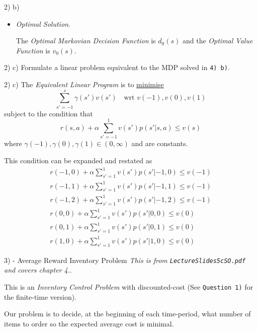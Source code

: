 \documentclass[11pt,a4paper]{article}
\begin{document}
\begin{answer}{2) b)}
\begin{itemize}
\begin{center}
\begin{tabular}{rcl}
        $d_1(s)$&=&\begin{tabular}{c|c}
          $s$&$d_1(s)$\\\hline
          -1&2\\
          0&1\\
          1&0
        \end{tabular}
      \end{tabular}
    \end{center}
    \underline{Stopping Criterion} - As $d_1(s)=d_0(s)\ \forall\ s\in S$, then $d_1(s)$ is optimal.
    \item \textit{Optimal Solution}.
    \par The \textit{Optimal Markovian Decision Function} is $d_0(s)$ and the \textit{Optimal Value Function} is $v_0(s)$.
  \end{itemize}
\end{answer}

\begin{question}{2) c)}
  Formulate a linear problem equivalent to the MDP solved in \texttt{4) b)}.
\end{question}

\begin{answer}{2) c)}
  The \textit{Equivalent Linear Program} is to \underline{minimise}
  \[ \sum_{s'=-1}^s\gamma(s')v(s')\quad\text{wrt }v(-1),v(0),v(1) \]
  subject to the condition that
  \[ r(s,a)+\alpha\sum_{s'=-1}^1v(s')p(s'|s,a)\leq v(s) \]
  where $\gamma(-1),\gamma(0),\gamma(1)\in(0,\infty)$ and are constants.
  \par This condition can be expanded and restated as
  \[\begin{array}{rcl}
    r(-1,0)+\alpha\sum_{s'=1}^1v(s')p(s'|-1,0)\leq v(-1)\\
    r(-1,1)+\alpha\sum_{s'=1}^1v(s')p(s'|-1,1)\leq v(-1)\\
    r(-1,2)+\alpha\sum_{s'=1}^1v(s')p(s'|-1,2)\leq v(-1)\\
    r(0,0)+\alpha\sum_{s'=1}^1v(s')p(s'|0,0)\leq v(0)\\
    r(0,1)+\alpha\sum_{s'=1}^1v(s')p(s'|0,1)\leq v(0)\\
    r(1,0)+\alpha\sum_{s'=1}^1v(s')p(s'|1,0)\leq v(0)
  \end{array}\]
\end{answer}

\newpage
\begin{question}{3) - Average Reward Inventory Problem}
  \textit{This is from \texttt{LectureSlides5cSO.pdf} and covers chapter 4.}.
  \par This is an \textit{Inventory Control Problem} with discounted-cost (See \texttt{Question 1)} for the finite-time version).
  \par Our problem is to decide, at the beginning of each time-period, what number of items to order so the expected average cost is minimal.
\end{question}
\end{document}
